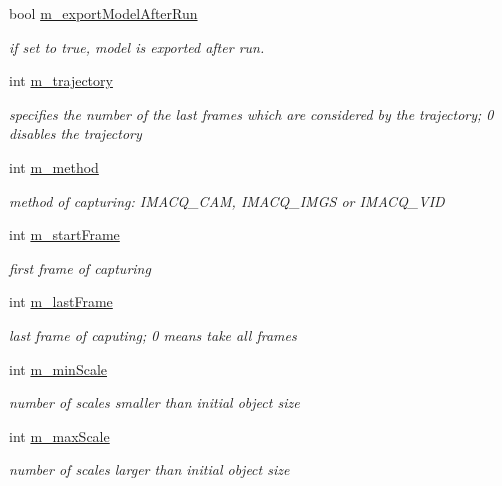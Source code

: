 \begin{DoxyCompactItemize}
bool \hyperlink{classtld_1_1_settings_a5d0b425a526e5f7f78c758bfde3d9ee9}{m\_\-exportModelAfterRun}
\begin{DoxyCompactList}\small\item\em if set to true, model is exported after run. \item\end{DoxyCompactList}\item 
int \hyperlink{classtld_1_1_settings_a56281480120f9cb2dbf69022cf97a30a}{m\_\-trajectory}
\begin{DoxyCompactList}\small\item\em specifies the number of the last frames which are considered by the trajectory; 0 disables the trajectory \item\end{DoxyCompactList}\item 
int \hyperlink{classtld_1_1_settings_a2438efb226c38f806bf1b3e023aa3760}{m\_\-method}
\begin{DoxyCompactList}\small\item\em method of capturing: IMACQ\_\-CAM, IMACQ\_\-IMGS or IMACQ\_\-VID \item\end{DoxyCompactList}\item 
int \hyperlink{classtld_1_1_settings_ac63c6dfae7c0be1fc167608dd52e1d7f}{m\_\-startFrame}
\begin{DoxyCompactList}\small\item\em first frame of capturing \item\end{DoxyCompactList}\item 
int \hyperlink{classtld_1_1_settings_a4935fe002dd6358506813d7c48ec5322}{m\_\-lastFrame}
\begin{DoxyCompactList}\small\item\em last frame of caputing; 0 means take all frames \item\end{DoxyCompactList}\item 
int \hyperlink{classtld_1_1_settings_a46e4d9f59b1f87508cf0ad9a154fdc21}{m\_\-minScale}
\begin{DoxyCompactList}\small\item\em number of scales smaller than initial object size \item\end{DoxyCompactList}\item 
int \hyperlink{classtld_1_1_settings_a548c317f8242ea8513d13573acdaaa4c}{m\_\-maxScale}
\begin{DoxyCompactList}\small\item\em number of scales larger than initial object size \item\end{DoxyCompactList}\item 

\end{DoxyCompactItemize}
